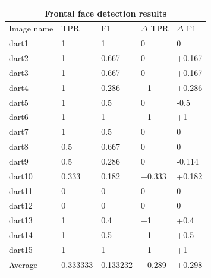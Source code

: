 \documentclass{article}
\begin{document}
\begin{multicols}{2}
{
}

\begin{center}
\begin{tabular}{ |p{1.3cm}||p{1.3cm}|p{1.3cm}|p{1.3cm}|p{1.3cm}| }
 \hline
 \multicolumn{5}{|c|}{Frontal face detection results} \\
 \hline
 Image name & TPR & F1 & \(\Delta\) TPR & \(\Delta\) F1 \\
 \hline
 dart1  & 1  & 1 & 0 & 0 \\
 dart2  & 1  & 0.667 & 0 & +0.167       \\
 dart3  & 1  & 0.667 & 0 & +0.167      \\
 dart4  & 1  & 0.286 & +1 & +0.286         \\
 dart5  & 1  & 0.5 & 0 & -0.5         \\
 dart6  & 1  & 1 & +1 & +1 \\
 dart7  & 1  & 0.5 & 0 & 0         \\
 dart8  & 0.5  & 0.667 & 0 & 0   \\
 dart9  & 0.5  & 0.286 & 0 & -0.114           \\
 dart10 & 0.333  & 0.182 & +0.333 & +0.182          \\
 dart11 & 0  & 0 & 0 & 0 \\
 dart12 & 0  & 0 & 0 & 0         \\
 dart13 & 1  & 0.4 & +1 & +0.4         \\
 dart14 & 1  & 0.5 & +1 & +0.5         \\
 dart15 & 1  & 1   & +1 & +1     \\
 \hline
 Average& 0.333333  & 0.133232 & +0.289 & +0.298   \\ 
 \hline
\end{tabular}
\label{tab:vjhoughdartstable}
\end{center}


\end{multicols}
\end{document}
